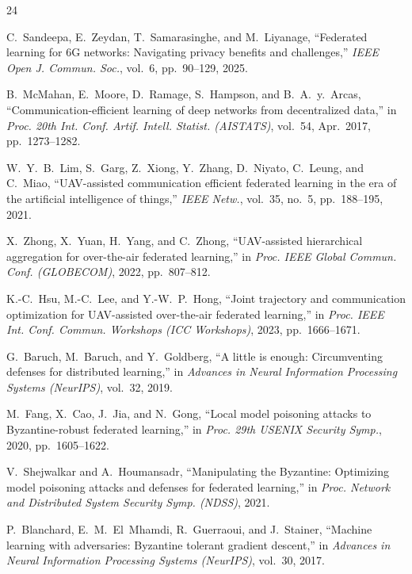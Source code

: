 \documentclass[journal]{IEEEtran}
\begin{document}
\begin{thebibliography}{24}

C.~Sandeepa, E.~Zeydan, T.~Samarasinghe, and M.~Liyanage, ``Federated learning for 6G networks: Navigating privacy benefits and challenges,'' \textit{IEEE Open J. Commun. Soc.}, vol.~6, pp.~90--129, 2025.

B.~McMahan, E.~Moore, D.~Ramage, S.~Hampson, and B.~A.~y.~Arcas, ``Communication-efficient learning of deep networks from decentralized data,'' in \textit{Proc. 20th Int. Conf. Artif. Intell. Statist. (AISTATS)}, vol.~54, Apr.~2017, pp.~1273--1282.

W.~Y.~B.~Lim, S.~Garg, Z.~Xiong, Y.~Zhang, D.~Niyato, C.~Leung, and C.~Miao, ``UAV-assisted communication efficient federated learning in the era of the artificial intelligence of things,'' \textit{IEEE Netw.}, vol.~35, no.~5, pp.~188--195, 2021.

X.~Zhong, X.~Yuan, H.~Yang, and C.~Zhong, ``UAV-assisted hierarchical aggregation for over-the-air federated learning,'' in \textit{Proc. IEEE Global Commun. Conf. (GLOBECOM)}, 2022, pp.~807--812.

K.-C.~Hsu, M.-C.~Lee, and Y.-W.~P.~Hong, ``Joint trajectory and communication optimization for UAV-assisted over-the-air federated learning,'' in \textit{Proc. IEEE Int. Conf. Commun. Workshops (ICC Workshops)}, 2023, pp.~1666--1671.

G.~Baruch, M.~Baruch, and Y.~Goldberg, ``A little is enough: Circumventing defenses for distributed learning,'' in \textit{Advances in Neural Information Processing Systems (NeurIPS)}, vol.~32, 2019.

M.~Fang, X.~Cao, J.~Jia, and N.~Gong, ``Local model poisoning attacks to Byzantine-robust federated learning,'' in \textit{Proc. 29th USENIX Security Symp.}, 2020, pp.~1605--1622.

V.~Shejwalkar and A.~Houmansadr, ``Manipulating the Byzantine: Optimizing model poisoning attacks and defenses for federated learning,'' in \textit{Proc. Network and Distributed System Security Symp. (NDSS)}, 2021.

P.~Blanchard, E.~M.~El~Mhamdi, R.~Guerraoui, and J.~Stainer, ``Machine learning with adversaries: Byzantine tolerant gradient descent,'' in \textit{Advances in Neural Information Processing Systems (NeurIPS)}, vol.~30, 2017.


\end{thebibliography}
\end{document}
